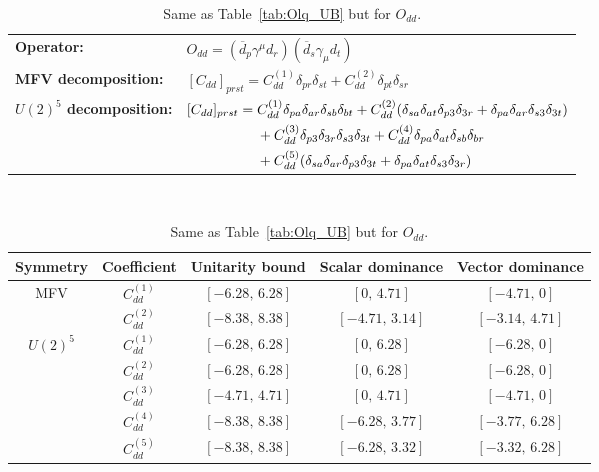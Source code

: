\begin{table}[htbp]
\centering
{\small
\begin{tabular}{ll}
    \textbf{Operator:} &
        $\boxed{O_{dd} = (\overline d_p \gamma^\mu d_r)(\overline d_s \gamma_\mu d_t)}$ \\[0.2cm]
    \textbf{MFV decomposition:} &
        $[C_{dd}]_{prst} =
            C_{dd}^{(1)}\delta_{pr}\delta_{st}
            + C_{dd}^{(2)}\delta_{pt}\delta_{sr}
            $ \\[0.15cm]
    \textbf{$U(2)^5$ decomposition:} &
        $[C_{dd}]_{prst} =
            C_{dd}^{(1)}\Pij{p}{r}{a}\Pij{s}{t}{b}
            + C_{dd}^{(2)}(\Pij{s}{t}{a}\delta_{p3}\delta_{3r} + \Pij{p}{r}{a}\delta_{s3}\delta_{3t})
            $ \\
        & $\phantom{[C_{dd}]_{prst} ={}}+ C_{dd}^{(3)}\delta_{p3}\delta_{3r}\delta_{s3}\delta_{3t}
            + C_{dd}^{(4)}\Pij{p}{t}{a}\Pij{s}{r}{b}
            $ \\
        & $\phantom{[C_{dd}]_{prst} ={}}+ C_{dd}^{(5)}(\Pij{s}{r}{a}\delta_{p3}\delta_{3t} + \Pij{p}{t}{a}\delta_{s3}\delta_{3r})$ \\
\end{tabular}
\\[0.3cm]
\renewcommand{\arraystretch}{1.3}
\begin{tabular}{ccccc}
    \toprule
    \rowcolor{hdrcolor}
    \textbf{Symmetry} & \textbf{Coefficient}
        & \textbf{Unitarity bound}
        & \textbf{Scalar dominance}
        & \textbf{Vector dominance} \\
    \midrule
    \multirow{2}{*}{MFV}
        & $C_{dd}^{(1)}$ & $[-6.28,\, 6.28]$  & $[0,\, 4.71]$      & $[-4.71,\, 0]$    \\
        & $C_{dd}^{(2)}$ & $[-8.38,\, 8.38]$  & $[-4.71,\, 3.14]$  & $[-3.14,\, 4.71]$ \\
    \midrule
    \multirow{5}{*}{$U(2)^5$}
        & $C_{dd}^{(1)}$ & $[-6.28,\, 6.28]$ & $[0,\, 6.28]$      & $[-6.28,\, 0]$    \\
        & $C_{dd}^{(2)}$ & $[-6.28,\, 6.28]$ & $[0,\, 6.28]$      & $[-6.28,\, 0]$    \\
        & $C_{dd}^{(3)}$ & $[-4.71,\, 4.71]$ & $[0,\, 4.71]$      & $[-4.71,\, 0]$    \\
        & $C_{dd}^{(4)}$ & $[-8.38,\, 8.38]$ & $[-6.28,\, 3.77]$  & $[-3.77,\, 6.28]$ \\
        & $C_{dd}^{(5)}$ & $[-8.38,\, 8.38]$ & $[-6.28,\, 3.32]$  & $[-3.32,\, 6.28]$ \\
    \bottomrule
\end{tabular}}
\caption{Same as Table~\ref{tab:Olq_UB} but for $O_{dd}$.}
\label{tab:Odd_UB}
\end{table}

